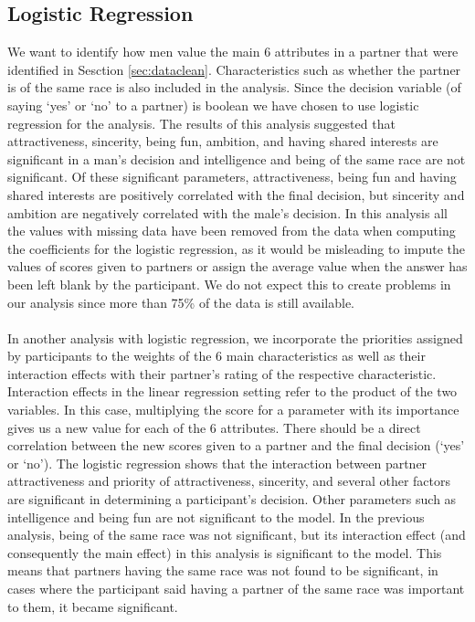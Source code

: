 \documentclass{article}
\begin{document}
\subsection{Logistic Regression}
\label{sec:logistic}
We want to identify how men value the main 6 attributes in a partner that were identified in Sesction \ref{sec:dataclean}.  Characteristics such as whether the partner is of the same race is also included in the analysis.  Since the decision variable (of saying `yes' or `no' to a partner) is boolean we have chosen to use logistic regression for the analysis.  The results of this analysis suggested that attractiveness, sincerity, being fun, ambition, and having shared interests are significant in a man's decision and intelligence and being of the same race are not significant. Of these significant parameters, attractiveness, being fun and having shared interests are positively correlated with the final decision, but sincerity and ambition are negatively correlated with the male's decision. In this analysis all the values with missing data have been removed from the data when computing the coefficients for the logistic regression, as it would be misleading to impute the values of scores given to partners or assign the average value when the answer has been left blank by the participant. We do not expect this to create problems in our analysis since more than 75\% of the data is still available. \\
\null\\
In another analysis with logistic regression, we incorporate the priorities assigned by participants to the weights of the 6 main characteristics as well as their interaction effects with their partner's rating of the respective characteristic.  Interaction effects in the linear regression setting refer to the product of the two variables.  In this case, multiplying the score for a parameter with its importance gives us a new value for each of the 6 attributes. There should be a direct correlation between the new scores given to a partner and the final decision (`yes' or `no').  
The logistic regression shows that the interaction between partner attractiveness and priority of attractiveness, sincerity, and several other factors are significant in determining a participant's decision.  Other parameters such as intelligence and being fun are not significant to the model. In the previous analysis, being of the same race was not significant, but its interaction effect (and consequently the main effect) in this analysis is significant to the model. This means that partners having the same race was not found to be significant, in cases where the participant said having a partner of the same race was important to them, it became significant.
%
\end{document}
